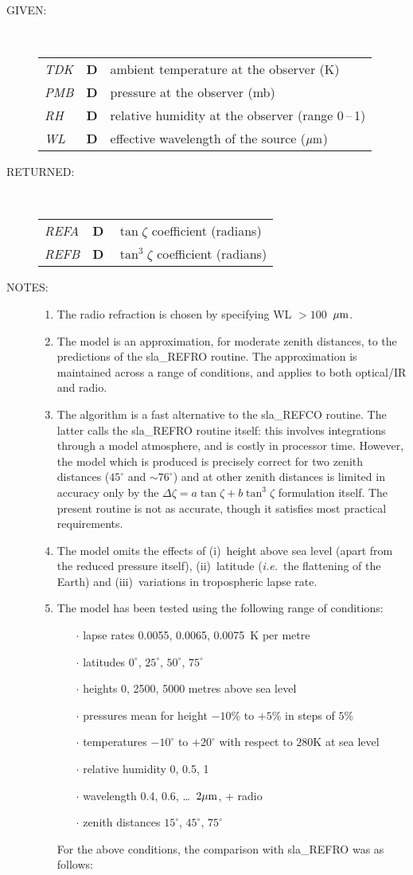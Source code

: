 \documentclass[11pt,twoside]{article}
\newlength{\oldspacing}
\newcommand{\args}[2]
{
  \goodbreak
  \setlength{\oldspacing}{\topsep}
  \setlength{\topsep}{0.3ex}
  \begin{description}
  \item[#1]:\\[1.5ex]
    \begin{tabular}{p{7em}p{6em}p{22em}}
      #2
    \end{tabular}
  \end{description}
  \setlength{\topsep}{\oldspacing}
}
\renewcommand{\args}[2]
   {
     \begin{description}
        \item[#1:]\\
        \begin{tabular}{p{7em}p{6em}l}
           #2
        \end{tabular}
     \end{description}
   }
\newcommand{\spec}[3]
{
  {\em {#1}} & {\bf \mbox{#2}} & {#3}
}
\newcommand{\notes}[1]
{
  \goodbreak
  \setlength{\oldspacing}{\topsep}
  \setlength{\topsep}{0.3ex}
  \begin{description}
    \item[NOTES]:
        #1
  \end{description}
  \setlength{\topsep}{\oldspacing}
}
\renewcommand{\notes}[1]
   {
      \begin{description}
         \item[NOTES:]
            #1
      \end{description}
   }
\begin{document}
\args{GIVEN}
{
 \spec{TDK}{D}{ambient temperature at the observer (K)} \\
 \spec{PMB}{D}{pressure at the observer (mb)} \\
 \spec{RH}{D}{relative humidity at the observer (range 0\,--\,1)} \\
 \spec{WL}{D}{effective wavelength of the source ($\mu{\rm m}$)}
}
\args{RETURNED}
{
 \spec{REFA}{D}{$\tan \zeta$ coefficient (radians)} \\
 \spec{REFB}{D}{$\tan^{3} \zeta$ coefficient (radians)}
}
\notes
{
 \begin{enumerate}
  \item The radio refraction is chosen by specifying WL $>100$~$\mu{\rm m}$.
  \item The model is an approximation, for moderate zenith distances,
        to the predictions of the sla\_REFRO routine.  The approximation
        is maintained across a range of conditions, and applies to
        both optical/IR and radio.
  \item The algorithm is a fast alternative to the sla\_REFCO routine.
        The latter calls the sla\_REFRO routine itself:  this involves
        integrations through a model atmosphere, and is costly in
        processor time.  However, the model which is produced is precisely
        correct for two zenith distances ($45^\circ$ and $\sim\!76^\circ$)
        and at other zenith distances is limited in accuracy only by the
        $\Delta \zeta = a \tan \zeta + b \tan^{3} \zeta$ formulation
        itself.  The present routine is not as accurate, though it
        satisfies most practical requirements.
  \item The model omits the effects of (i)~height above sea level (apart
        from the reduced pressure itself), (ii)~latitude ({\it i.e.}\ the
        flattening of the Earth) and (iii)~variations in tropospheric
        lapse rate.
  \item The model has been tested using the following range of conditions:
        \begin{itemize}
        \item [$\cdot$] lapse rates 0.0055, 0.0065, 0.0075~K per metre
        \item [$\cdot$] latitudes $0^\circ$, $25^\circ$, $50^\circ$, $75^\circ$
        \item [$\cdot$] heights 0, 2500, 5000 metres above sea level
        \item [$\cdot$] pressures mean for height $-10$\% to $+5$\% in steps of $5$\%
        \item [$\cdot$] temperatures $-10^\circ$ to $+20^\circ$ with respect to
              $280$K at sea level
        \item [$\cdot$] relative humidity 0, 0.5, 1
        \item [$\cdot$] wavelength 0.4, 0.6, \ldots\ $2\mu{\rm m}$, + radio
        \item [$\cdot$] zenith distances $15^\circ$, $45^\circ$, $75^\circ$
        \end{itemize}
        For the above conditions, the comparison with sla\_REFRO
        was as follows:


\end{enumerate}}
\end{document}
